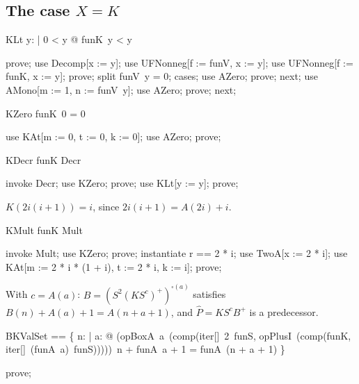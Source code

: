 \documentclass{article}
\begin{document}
\subsection{The case $X = K$}

\begin{theorem}{KLt}
  \forall y: \nat | 0 < y @ funK~y < y
\end{theorem}

\begin{zproof}
prove;
use Decomp[x := y];
use UFNonneg[f := funV, x := y];
use UFNonneg[f := funK, x := y];
prove;
split funV~y = 0;
cases;
use AZero;
prove;
next;
use AMono[m := 1, n := funV~y];
use AZero;
prove;
next;
\end{zproof}

\begin{theorem}{KZero}
  funK~0 = 0
\end{theorem}

\begin{zproof}
use KAt[m := 0, t := 0, k := 0];
use AZero;
prove;
\end{zproof}

\begin{theorem}{KDecr}
  funK \in Decr
\end{theorem}

\begin{zproof}
invoke Decr;
use KZero;
prove;
use KLt[y := y];
prove;
\end{zproof}

$K(2i(i+1)) = i$, since $2i(i+1) = A(2i) + i$.

\begin{theorem}{KMult}
  funK \in Mult
\end{theorem}

\begin{zproof}
invoke Mult;
use KZero;
prove;
instantiate r == 2 * i;
use TwoA[x := 2 * i];
use KAt[m := 2 * i * (1 + i), t := 2 * i, k := i];
prove;
\end{zproof}

With $c = A(a)$: $B = (S^2 (K S^c)^+)^{\square(a)}$ satisfies $B(n) + A(a) + 1 = A(n + a + 1)$,
and $\hat P = K S^c B^+$ is a predecessor.

\begin{zed}
  BKValSet == \{ n: \nat | \forall a: \nat @ (opBoxA~a~(comp(iter[\nat]~2~funS, opPlusI~(comp(funK, iter[\nat]~(funA~a)~funS)))))~n + funA~a + 1 = funA~(n + a + 1) \}
\end{zed}

\begin{zproof}
prove;
\end{zproof}
\end{document}
